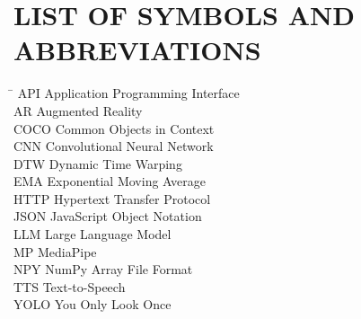 \documentclass[12pt, a4paper]{report}
\begin{document}
\newpage
\renewcommand{\contentsname}{\centering TABLE OF CONTENTS}
\tableofcontents

\newpage
\renewcommand{\listtablename}{\centering LIST OF TABLES}
\listoftables

\newpage
\renewcommand{\listfigurename}{\centering LIST OF FIGURES}
\listoffigures

\newpage
\chapter*{LIST OF SYMBOLS AND ABBREVIATIONS}

\begin{tabbing}
\hspace{4cm} \= \kill
API \> Application Programming Interface \\[6pt]
AR \> Augmented Reality \\[6pt]
COCO \> Common Objects in Context \\[6pt]
CNN \> Convolutional Neural Network \\[6pt]
DTW \> Dynamic Time Warping \\[6pt]
EMA \> Exponential Moving Average \\[6pt]
HTTP \> Hypertext Transfer Protocol \\[6pt]
JSON \> JavaScript Object Notation \\[6pt]
LLM \> Large Language Model \\[6pt]
MP \> MediaPipe \\[6pt]
NPY \> NumPy Array File Format \\[6pt]
TTS \> Text-to-Speech \\[6pt]
YOLO \> You Only Look Once \\
\end{tabbing}
\end{document}
